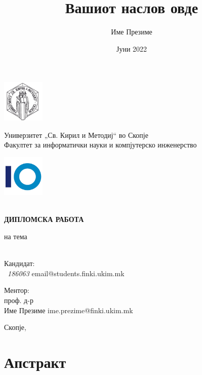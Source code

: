 \documentclass{report}
\title{Вашиот наслов овде}
\author{Име Презиме}
\date{Јуни 2022}
\begin{document}
\makeatletter
\begin{titlepage}
\noindent
\includegraphics[width=0.15\textwidth]{images/logos/ukim.png}
\begin{minipage}[b]{0.7\textwidth}
\centering
Универзитет „Св. Кирил и Методиј“ во Скопје \\
Факултет за информатички науки и компјутерско инженерство
\end{minipage}%
\includegraphics[width=0.15\textwidth]{images/logos/fcse.png}
\begin{center}
\\[15ex]
\Large \bfseries ДИПЛОМСКА РАБОТА

\small на тема \\[10ex]

{\huge \bfseries  \@title }\\[25ex]
\end{center}
\noindent
\begin{minipage}[t]{.45\textwidth}
\raggedright
Кандидат: \\
\@author\ \textit{186063}
email@students.finki.ukim.mk
\end{minipage}
\hfill
\noindent
\begin{minipage}[t]{.45\textwidth}
\raggedleft
Ментор: \\
проф. д-р \\ Име Презиме
ime.prezime@finki.ukim.mk
\end{minipage}
            
                \mbox{}
                \vfill
            \begin{center}
                {\large Скопје, \@date}
            \end{center}
\end{titlepage}

\newpage

\tableofcontents

\newpage

\section*{Апстракт}
\end{document}
